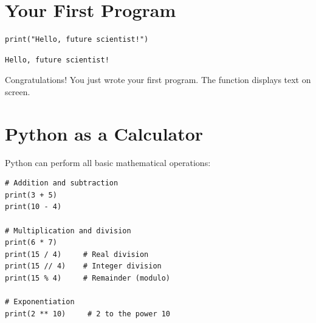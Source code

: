 
\begin{center}
\end{center}

\section{Your First Program}

\begin{codeblock}[title=\textbf{Python}]
\begin{verbatim}
print("Hello, future scientist!")
\end{verbatim}
\end{codeblock}

\begin{codeoutput}
\begin{verbatim}
Hello, future scientist!
\end{verbatim}
\end{codeoutput}

Congratulations! You just wrote your first program. The  function displays text on screen.

\section{Python as a Calculator}

Python can perform all basic mathematical operations:

\begin{codeblock}[title=\textbf{Python --- Basic calculations}]
\begin{verbatim}
# Addition and subtraction
print(3 + 5)
print(10 - 4)

# Multiplication and division
print(6 * 7)
print(15 / 4)     # Real division
print(15 // 4)    # Integer division
print(15 % 4)     # Remainder (modulo)

# Exponentiation
print(2 ** 10)     # 2 to the power 10
\end{verbatim}
\end{codeblock}

